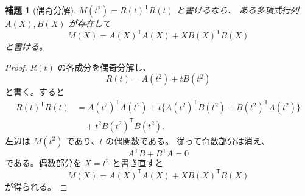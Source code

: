 \documentclass[uplatex,dvipdfmx]{jsarticle}
\newcommand{\restateprefix}{}
\theoremstyle{matrixsosdefinition}
\newtheorem{lemma}[theorem]{補題}
\begin{document}
\begin{lemma}[偶奇分解]\label{lem:even-odd-sos-splitting}
  \(M(t^2)=R(t)^{\mathsf T}R(t)\) と書けるなら、
  ある多項式行列 \(A(X),B(X)\) が存在して
  \[
    M(X)=A(X)^{\mathsf T}A(X)+X B(X)^{\mathsf T}B(X)
  \]
  と書ける。
\end{lemma}

\begin{proof}
  \(R(t)\) の各成分を偶奇分解し、
  \[
    R(t)=A(t^2)+tB(t^2)
  \]
  と書く。すると
  \[
  \begin{aligned}
    R(t)^{\mathsf T}R(t)
    &=
    A(t^2)^{\mathsf T}A(t^2)
    +t\{A(t^2)^{\mathsf T}B(t^2)+B(t^2)^{\mathsf T}A(t^2)\}\\
    &\quad
    +t^2 B(t^2)^{\mathsf T}B(t^2).
  \end{aligned}
  \]
  左辺は \(M(t^2)\) であり、\(t\) の偶関数である。
  従って奇数部分は消え、
  \[
    A^{\mathsf T}B+B^{\mathsf T}A=0
  \]
  である。偶数部分を \(X=t^2\) と書き直すと
  \[
    M(X)=A(X)^{\mathsf T}A(X)+X B(X)^{\mathsf T}B(X)
  \]
  が得られる。
\end{proof}

{\renewcommand{\restateprefix}{再掲; }\halfLineMarkovLukacs*}
\end{document}
